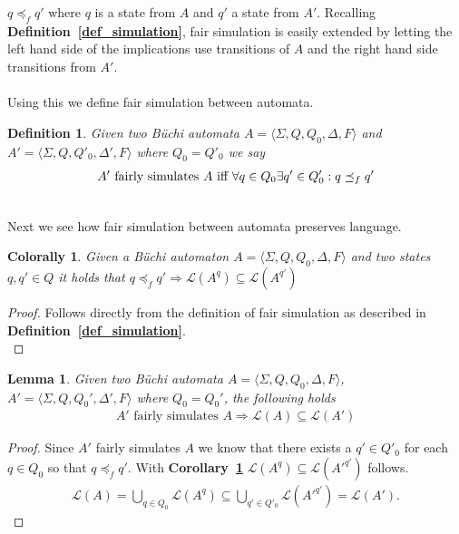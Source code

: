 \documentclass[12pt,oneside,bibliography=totoc,abstracton]{scrartcl}
\newcommand{\corollaryref}[1]{\textbf{Corollary~\ref{#1}}}
\newcommand{\defref}[1]{\textbf{Definition~\ref{#1}}}
\newtheorem{mydef}{Definition}
\newtheorem{mylemma}{Lemma}
\newtheorem{mycorollary}{Colorally}
\begin{document}
$q \preceq_f q'$ where $q$ is a state from $A$ and $q'$ a state from $A'$.
Recalling \defref{def_simulation}, fair simulation is easily extended by letting the left hand side of the implications
use transitions of $A$ and the right hand side transitions from $A'$.\\\\
Using this we define fair simulation between automata.
\begin{mydef}\label{def_automatasimulation}
	Given two Büchi automata $A = \langle\Sigma, Q, Q_0, \Delta, F\rangle$ and
	$A' = \langle\Sigma, Q, Q'_0, \Delta', F\rangle$ where $Q_0 = Q'_0$ we say
	\begin{align*}
		 A' \textnormal{ fairly simulates } A \text{ iff } \forall q \in Q_0 \exists q' \in Q'_0 : q \preceq_f q'
	\end{align*}
\end{mydef}\quad\\
Next we see how fair simulation between automata preserves language.
\begin{mycorollary}\label{corollary_smallinclusion}
	Given a Büchi automaton $A = \langle\Sigma, Q, Q_0, \Delta, F\rangle$ and two states $q, q' \in Q$ it holds that
	$q \preceq_f q' \Rightarrow \mathcal{L}(A^q) \subseteq \mathcal{L}(A^{q'})$ 
\end{mycorollary}
\begin{proof}
	Follows directly from the definition of fair simulation as described in \defref{def_simulation}.\\
\end{proof}
\begin{mylemma}\label{lemma_biginclusion}
	Given two Büchi automata $A = \langle\Sigma, Q , Q_0, \Delta, F\rangle$,
	$A' = \langle\Sigma, Q, Q_0', \Delta', F\rangle$ where $Q_0 = Q_0'$, the following holds
	\begin{align*}
		A' \text{ fairly simulates } A \Rightarrow \mathcal{L}(A) \subseteq \mathcal{L}(A')
	\end{align*}
\end{mylemma}
\begin{proof}
	Since $A'$ fairly simulates $A$ we know that there exists a $q' \in Q'_0$ for each $q \in Q_0$ so that $q \preceq_f q'$.
	With \corollaryref{corollary_smallinclusion} $\mathcal{L}(A^q) \subseteq \mathcal{L}(A'^{q'})$ follows.
	\begin{align*}
		\mathcal{L}(A) = \bigcup\limits_{q \in Q_0} \mathcal{L}(A^{q})
		\subseteq \bigcup\limits_{q' \in Q'_0} \mathcal{L}(A'^{q'}) = \mathcal{L}(A').
	\end{align*}
\end{proof}
\end{document}
